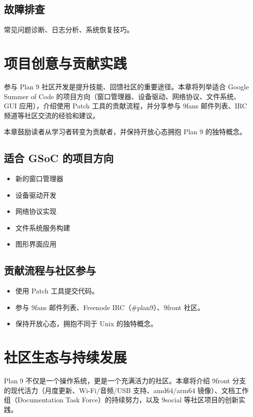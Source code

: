 \documentclass[12pt,UTF8]{ctexbook}
\begin{document}
\section{故障排查}

常见问题诊断、日志分析、系统恢复技巧。

\chapter{项目创意与贡献实践}

参与 Plan 9 社区开发是提升技能、回馈社区的重要途径。本章将列举适合 Google Summer of Code 的项目方向（窗口管理器、设备驱动、网络协议、文件系统、GUI 应用），介绍使用 Patch 工具的贡献流程，并分享参与 9fans 邮件列表、IRC 频道等社区交流的经验和建议。

本章鼓励读者从学习者转变为贡献者，并保持开放心态拥抱 Plan 9 的独特概念。

\section{适合 GSoC 的项目方向}

\begin{itemize}
\item 新的窗口管理器
\item 设备驱动开发
\item 网络协议实现
\item 文件系统服务构建
\item 图形界面应用
\end{itemize}

\section{贡献流程与社区参与}

\begin{itemize}
\item 使用 Patch 工具提交代码。
\item 参与 9fans 邮件列表、Freenode IRC（\#plan9）、9front 社区。
\item 保持开放心态，拥抱不同于 Unix 的独特概念。
\end{itemize}

\chapter{社区生态与持续发展}

Plan 9 不仅是一个操作系统，更是一个充满活力的社区。本章将介绍 9front 分支的现代活力（月度更新、Wi-Fi/音频/USB 支持、amd64/arm64 镜像）、文档工作组（Documentation Task Force）的持续努力，以及 9social 等社区项目的创新实践。
\end{document}

